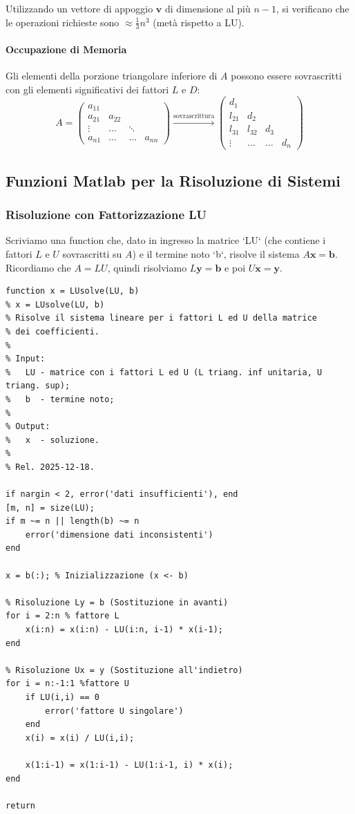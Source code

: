 Utilizzando un vettore di appoggio $\mathbf{v}$ di dimensione al più $n-1$, si verificano che le operazioni richieste sono $\approx \frac{1}{3}n^3$ (metà rispetto a LU).

\paragraph{Occupazione di Memoria}
Gli elementi della porzione triangolare inferiore di $A$ possono essere sovrascritti con gli elementi significativi dei fattori $L$ e $D$:
$$
A = \begin{pmatrix}
a_{11} & & & \\
a_{21} & a_{22} & & \\
\vdots & \dots & \ddots & \\
a_{n1} & \dots & \dots & a_{nn}
\end{pmatrix} 
\xrightarrow{\text{sovrascrittura}} 
\begin{pmatrix}
d_1 & & & \\
l_{21} & d_2 & & \\
l_{31} & l_{32} & d_3 & \\
\vdots & \dots & \dots & d_n
\end{pmatrix}
$$


\subsection{Funzioni Matlab per la Risoluzione di Sistemi}

\subsubsection{Risoluzione con Fattorizzazione LU}
Scriviamo una function che, dato in ingresso la matrice `LU` (che contiene i fattori $L$ e $U$ sovrascritti su $A$) e il termine noto `b`, risolve il sistema $A\mathbf{x} = \mathbf{b}$.
Ricordiamo che $A=LU$, quindi risolviamo $L\mathbf{y}=\mathbf{b}$ e poi $U\mathbf{x}=\mathbf{y}$.

\begin{lstlisting}
function x = LUsolve(LU, b)
% x = LUsolve(LU, b)
% Risolve il sistema lineare per i fattori L ed U della matrice 
% dei coefficienti.
%
% Input:
%   LU - matrice con i fattori L ed U (L triang. inf unitaria, U triang. sup);
%   b  - termine noto;
%
% Output:
%   x  - soluzione.
%
% Rel. 2025-12-18.

if nargin < 2, error('dati insufficienti'), end
[m, n] = size(LU);
if m ~= n || length(b) ~= n
    error('dimensione dati inconsistenti')
end

x = b(:); % Inizializzazione (x <- b)

% Risoluzione Ly = b (Sostituzione in avanti)
for i = 2:n % fattore L
    x(i:n) = x(i:n) - LU(i:n, i-1) * x(i-1); 
end

% Risoluzione Ux = y (Sostituzione all'indietro)
for i = n:-1:1 %fattore U
    if LU(i,i) == 0
        error('fattore U singolare')
    end
    x(i) = x(i) / LU(i,i); 

    x(1:i-1) = x(1:i-1) - LU(1:i-1, i) * x(i); 
end

return
\end{lstlisting}
\vspace{0.3 cm}
